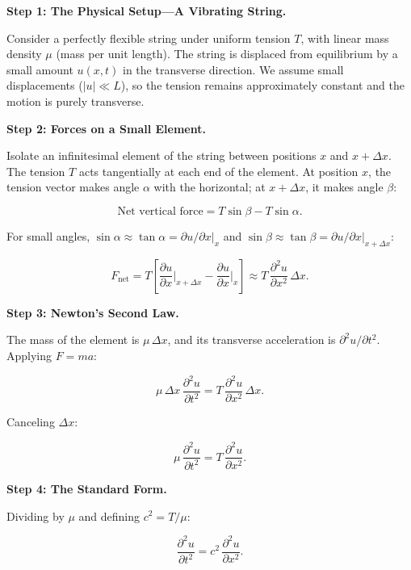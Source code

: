 \textbf{Step 1: The Physical Setup---A Vibrating String.}

Consider a perfectly flexible string under uniform tension $T$, with linear mass density $\mu$ (mass per unit length). The string is displaced from equilibrium by a small amount $u(x,t)$ in the transverse direction. We assume small displacements ($|u| \ll L$), so the tension remains approximately constant and the motion is purely transverse.

\textbf{Step 2: Forces on a Small Element.}

Isolate an infinitesimal element of the string between positions $x$ and $x + \Delta x$. The tension $T$ acts tangentially at each end of the element. At position $x$, the tension vector makes angle $\alpha$ with the horizontal; at $x + \Delta x$, it makes angle $\beta$:

\begin{equation}
\text{Net vertical force} = T\sin\beta - T\sin\alpha.
\end{equation}

For small angles, $\sin\alpha \approx \tan\alpha = \partial u/\partial x\big|_x$ and $\sin\beta \approx \tan\beta = \partial u/\partial x\big|_{x+\Delta x}$:

\begin{equation}
F_{\text{net}} = T\left[\frac{\partial u}{\partial x}\bigg|_{x+\Delta x} - \frac{\partial u}{\partial x}\bigg|_x\right] \approx T\,\frac{\partial^2 u}{\partial x^2}\,\Delta x.
\end{equation}

\textbf{Step 3: Newton's Second Law.}

The mass of the element is $\mu\,\Delta x$, and its transverse acceleration is $\partial^2 u/\partial t^2$. Applying $F = ma$:

\begin{equation}
\mu\,\Delta x\,\frac{\partial^2 u}{\partial t^2} = T\,\frac{\partial^2 u}{\partial x^2}\,\Delta x.
\end{equation}

Canceling $\Delta x$:

\begin{equation}
\mu\,\frac{\partial^2 u}{\partial t^2} = T\,\frac{\partial^2 u}{\partial x^2}.
\end{equation}

\textbf{Step 4: The Standard Form.}

Dividing by $\mu$ and defining $c^2 = T/\mu$:

\begin{equation}
\boxed{\frac{\partial^2 u}{\partial t^2} = c^2\,\frac{\partial^2 u}{\partial x^2}.}
\end{equation}

